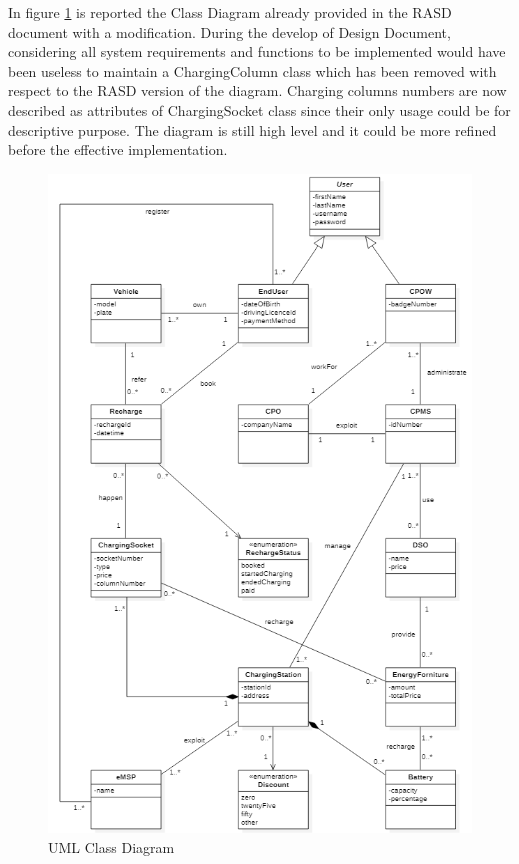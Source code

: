 \documentclass[a4paper]{report}
\begin{document}
In figure \ref{fig:classDiagram} is reported the Class Diagram already provided in the RASD document with a modification. During the develop of Design Document, considering all system requirements and functions to be implemented would have been useless to maintain a ChargingColumn class which has been removed with respect to the RASD version of the diagram. Charging columns numbers are now described as attributes of ChargingSocket class since their only usage could be for descriptive purpose. The diagram is still high level and it could be more refined before the effective implementation.

\begin{figure}[htp]
\includegraphics[width=\textwidth]{img/classDiagramDD.png}
\caption{UML Class Diagram}
\label{fig:classDiagram}
\end{figure}
\restoregeometry
\end{document}
